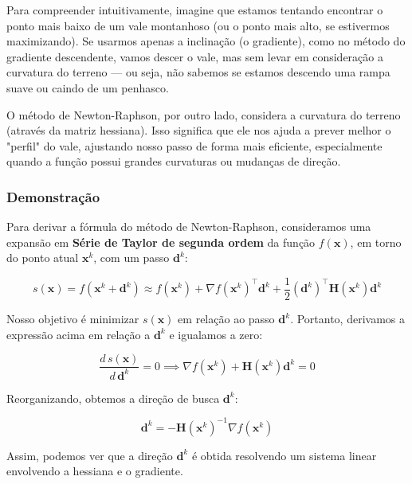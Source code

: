 \documentclass[a4paper, 12pt]{article}
\begin{document}
Para compreender intuitivamente, imagine que estamos tentando encontrar o ponto mais baixo de um vale montanhoso (ou o ponto mais alto, se estivermos maximizando). Se usarmos apenas a inclinação (o gradiente), como no método do gradiente descendente, vamos descer o vale, mas sem levar em consideração a curvatura do terreno — ou seja, não sabemos se estamos descendo uma rampa suave ou caindo de um penhasco.

O método de Newton-Raphson, por outro lado, considera a curvatura do terreno (através da matriz hessiana). Isso significa que ele nos ajuda a prever melhor o "perfil" do vale, ajustando nosso passo de forma mais eficiente, especialmente quando a função possui grandes curvaturas ou mudanças de direção.

\subsubsection*{Demonstração}

Para derivar a fórmula do método de Newton-Raphson, consideramos uma expansão em \textbf{Série de Taylor de segunda ordem} da função $f(\mathbf{x})$, em torno do ponto atual $\mathbf{x}^k$, com um passo $\mathbf{d}^k$:

\begin{equation}
    s(\mathbf{x}) = f(\mathbf{x}^k + \mathbf{d}^k) \approx f(\mathbf{x}^k) + \nabla f(\mathbf{x}^k)^\top \mathbf{d}^k + \frac{1}{2} (\mathbf{d}^k)^\top \mathbf{H}(\mathbf{x}^k) \mathbf{d}^k
\end{equation}

Nosso objetivo é minimizar $s(\mathbf{x})$ em relação ao passo $\mathbf{d}^k$. Portanto, derivamos a expressão acima em relação a $\mathbf{d}^k$ e igualamos a zero:

\begin{equation}
    \frac{d \, s(\mathbf{x})}{d \, \mathbf{d}^k} = 0 \implies \nabla f(\mathbf{x}^k) + \mathbf{H}(\mathbf{x}^k) \mathbf{d}^k = 0
\end{equation}

Reorganizando, obtemos a direção de busca $\mathbf{d}^k$:

\begin{equation}
    \mathbf{d}^k = -\mathbf{H}(\mathbf{x}^k)^{-1} \nabla f(\mathbf{x}^k)
\end{equation}

Assim, podemos ver que a direção $\mathbf{d}^k$ é obtida resolvendo um sistema linear envolvendo a hessiana e o gradiente.
\end{document}
